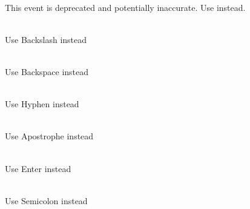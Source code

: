 \begin{DoxyRefList}
\item[Struct \doxylink{structsf_1_1Event_1_1MouseWheelEvent}{sf\+::Event\+::Mouse\+Wheel\+Event} ]\hfill \\
\label{deprecated__deprecated000023}%
%
This event is deprecated and potentially inaccurate. Use  instead. 
\item[Member \doxylink{classsf_1_1Keyboard_acb4cacd7cc5802dec45724cf3314a142a536df84e73859aa44e11e192459470b6}{sf\+::Keyboard\+::Back\+Slash} ]\hfill \\
\label{deprecated__deprecated000027}%
%
Use Backslash instead  
\item[Member \doxylink{classsf_1_1Keyboard_acb4cacd7cc5802dec45724cf3314a142a33aeaab900abcd01eebf2fcc4f6d97e2}{sf\+::Keyboard\+::Back\+Space} ]\hfill \\
\label{deprecated__deprecated000026}%
%
Use Backspace instead  
\item[Member \doxylink{classsf_1_1Keyboard_acb4cacd7cc5802dec45724cf3314a142a401a183dcfde0a06cb60fe6c91fa1e39}{sf\+::Keyboard\+::Dash} ]\hfill \\
\label{deprecated__deprecated000025}%
%
Use Hyphen instead  
\item[Member \doxylink{classsf_1_1Keyboard_acb4cacd7cc5802dec45724cf3314a142af031edb6bcf319734a6664388958c475}{sf\+::Keyboard\+::Quote} ]\hfill \\
\label{deprecated__deprecated000030}%
%
Use Apostrophe instead  
\item[Member \doxylink{classsf_1_1Keyboard_acb4cacd7cc5802dec45724cf3314a142ac291de81bdee518d636bc359f2ca77de}{sf\+::Keyboard\+::Return} ]\hfill \\
\label{deprecated__deprecated000029}%
%
Use Enter instead  
\item[Member \doxylink{classsf_1_1Keyboard_acb4cacd7cc5802dec45724cf3314a142a460ab09a36f9ed230504b89b9815de88}{sf\+::Keyboard\+::Semi\+Colon} ]\hfill \\
\label{deprecated__deprecated000028}%
%
Use Semicolon instead  
\item[Member \doxylink{classsf_1_1Keyboard_acb4cacd7cc5802dec45724cf3314a142a90be0882086bccb516e3afc5c7fb82eb}{sf\+::Keyboard\+::Tilde} ]\hfill \\

\end{DoxyRefList}
